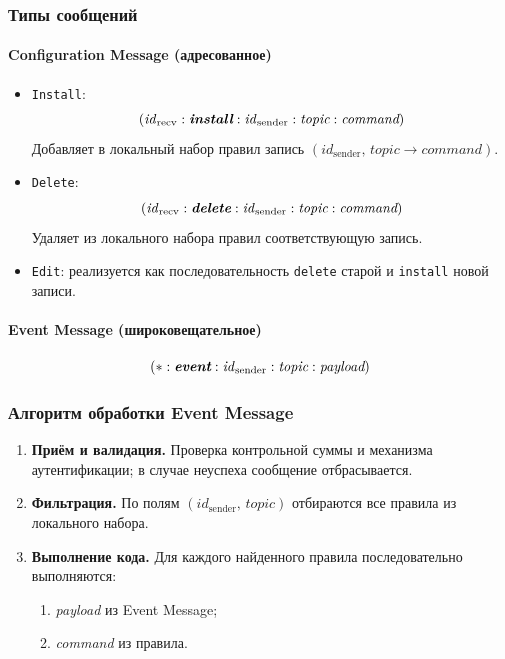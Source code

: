 \documentclass[14pt,a4paper]{extarticle}
\begin{document}
\subsubsection{Типы сообщений}

\paragraph{Configuration Message (адресованное)}
\begin{itemize}
  \item \texttt{Install}: 
  \[ (\mathit{id}_{\mathrm{recv}} :  \textit{\textbf{install}} : \mathit{id}_{\mathrm{sender}} : \textit{topic} : \textit{command}) \]
  Добавляет в локальный набор правил запись \((\mathit{id}_{\mathrm{sender}},\,\textit{topic}\to\textit{command})\).

  \item \texttt{Delete}: 
  \[ (\mathit{id}_{\mathrm{recv}} : \textit{\textbf{delete}} : \mathit{id}_{\mathrm{sender}} : \textit{topic} : \textit{command}) \]
  Удаляет из локального набора правил соответствующую запись.

  \item \texttt{Edit}: реализуется как последовательность \texttt{delete} старой и \texttt{install} новой записи.
\end{itemize}

\paragraph{Event Message (широковещательное)}
\[
(* : \textit{\textbf{event}} : \mathit{id}_{\mathrm{sender}} : \textit{topic} : \textit{payload})
\]


\subsubsection{Алгоритм обработки Event Message}

\begin{enumerate}
  \item \textbf{Приём и валидация.} Проверка контрольной суммы и механизма аутентификации; в случае неуспеха сообщение отбрасывается.
  \item \textbf{Фильтрация.} По полям $(\mathit{id}_{\mathrm{sender}},\,\textit{topic})$ отбираются все правила из локального набора.
  \item \textbf{Выполнение кода.} Для каждого найденного правила последовательно выполняются:
    \begin{enumerate}
      \item \textit{payload} из Event Message;
      \item \textit{command} из правила.
    \end{enumerate}
\end{enumerate}
\end{document}
